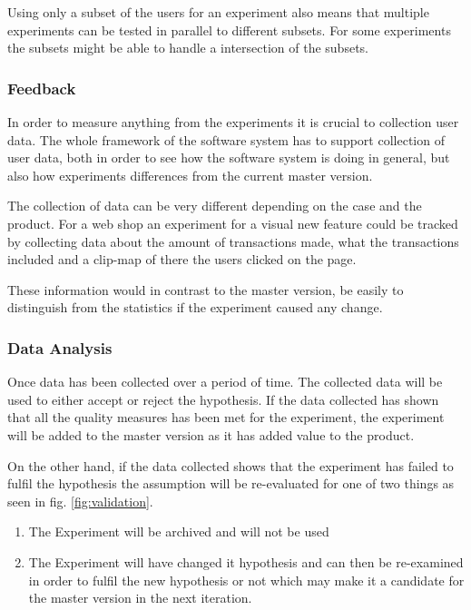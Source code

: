 \documentclass{sig-alternate}
\begin{document}
Using only a subset of the users for an experiment also means that multiple experiments can be tested in 
parallel to different subsets. For some experiments the subsets might be able to handle a intersection of 
the subsets. 

\subsubsection{Feedback}
\label{cx:feedback}
In order to measure anything from the experiments it is crucial to collection user data.
The whole framework of the software system has to support collection of user data, both in order to see how 
the software system is doing in general, but also how experiments differences from the current master version.

The collection of data can be very different depending on the case and the product. 
For a web shop an experiment for a visual new feature could be tracked by collecting data about the amount 
of transactions made, what the transactions included and a clip-map of there the users clicked on the page.

These information would in contrast to the master version, be easily to distinguish from the statistics if 
the experiment caused any change.

\subsubsection{Data Analysis}
\label{cx:analyse}
Once data has been collected over a period of time. The collected data will be used to either accept or reject
the hypothesis. 
If the data collected has shown that all the quality measures has been met for the experiment, 
the experiment will be added to the master version as it has added value to the product.

On the other hand, if the data collected shows that the experiment has failed to fulfil the hypothesis 
the assumption will be re-evaluated for one of two things as seen in fig. \ref{fig:validation}. 
\begin{enumerate}
\item The Experiment will be archived and will not be used
\item The Experiment will have changed it hypothesis and can then be re-examined in order to fulfil the new 
hypothesis or not which may make it a candidate for the master version in the next iteration.
\end{enumerate}
\end{document}
